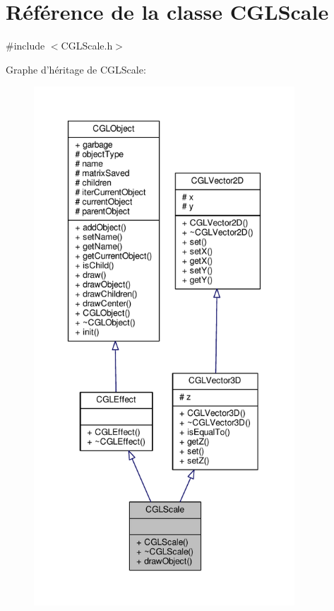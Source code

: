 \hypertarget{class_c_g_l_scale}{\section{Référence de la classe C\-G\-L\-Scale}
\label{class_c_g_l_scale}
}


{\ttfamily \#include $<$C\-G\-L\-Scale.\-h$>$}



Graphe d'héritage de C\-G\-L\-Scale\-:
\nopagebreak
\begin{figure}[H]
\begin{center}
\leavevmode
\includegraphics[height=550pt]{d9/d69/class_c_g_l_scale__inherit__graph}
\end{center}
\end{figure}


